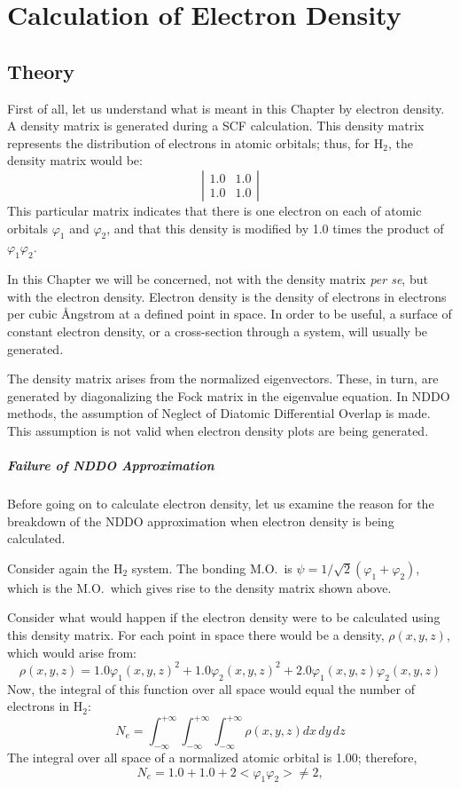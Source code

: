\chapter{Calculation of Electron Density}
\section{Theory}
First of all, let us understand what is meant in this Chapter by electron
density.
A density matrix is generated during a SCF calculation.  This density matrix
represents the distribution of electrons in atomic orbitals; thus, for H$_2$,
the density matrix would be:
\[
\left | \begin{array}{cc} 1.0 & 1.0 \\ 1.0 & 1.0 \end{array} \right |
\]
This particular matrix indicates that there is one electron on each of atomic
orbitals $\varphi_1$ and $\varphi_2$, and that this density is modified by 1.0
times the product of $\varphi_1\varphi_2$.

In this Chapter we will be concerned, not with the density matrix {\em per se},
but with the electron density.  Electron density is the density of electrons in
electrons per cubic \AA ngstrom at a defined point in space.  In order to be
useful,  a surface of constant electron density, or a cross-section through a
system, will usually be generated.

The density matrix arises from the normalized eigenvectors.  These, in turn,
are generated by diagonalizing the Fock matrix in the eigenvalue equation.  In
NDDO  methods, the assumption of Neglect of Diatomic Differential
Overlap is made. This assumption is not valid when electron density plots are
being generated.

\paragraph*{Failure of NDDO Approximation}
Before going on to calculate  electron density, let us examine the reason for
the breakdown of the NDDO approximation when electron density is being
calculated.

Consider again the H$_2$ system.  The bonding M.O.\  is $\psi =
1/\sqrt{2}(\varphi_1 + \varphi_2)$, which is   the M.O.\ which gives rise to the
density matrix shown above.

Consider what would happen if the electron density were to be calculated using
this density matrix.  For each point in space there would be a density, $\rho(x,y,z)$,
which would arise from:
$$
\rho(x,y,z) = 1.0\varphi_1(x,y,z)^2 + 1.0\varphi_2(x,y,z)^2 + 2.0\varphi_1(x,y,z)\varphi_2(x,y,z)
$$
Now, the integral of this function over all space would equal the number of electrons
in H$_2$:
$$
 N_e = \int_{-\infty}^{+\infty}\int_{-\infty}^{+\infty}\int_{-\infty}^{+\infty}\rho(x,y,z)dx\,dy\,dz
$$
 The integral over all space of a normalized atomic orbital is 1.00; therefore,
$$
N_e = 1.0 + 1.0 + 2<\varphi_1\varphi_2> \neq 2,
$$

